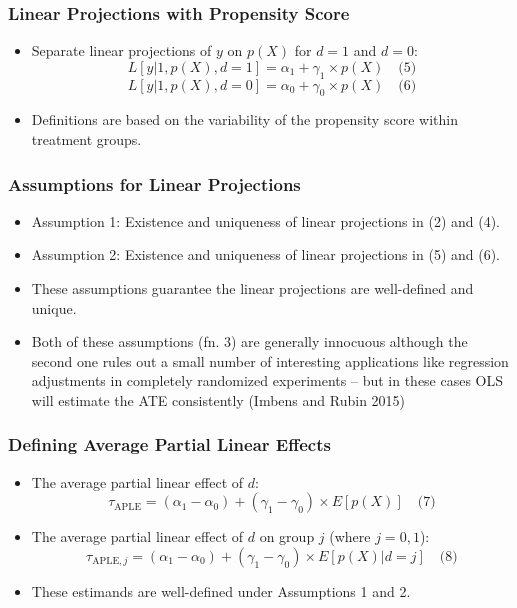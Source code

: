 \documentclass{beamer}
\begin{document}
\begin{frame}
\frametitle{Linear Projections with Propensity Score}
\begin{itemize}
    \item Separate linear projections of \( y \) on \( p(X) \) for \( d = 1 \) and \( d = 0 \):
    \[ L[y | 1, p(X), d = 1] = \alpha_1 + \gamma_1 \times p(X) \quad \text{(5)} \]
    \[ L[y | 1, p(X), d = 0] = \alpha_0 + \gamma_0 \times p(X) \quad \text{(6)} \]
    \item Definitions are based on the variability of the propensity score within treatment groups.
\end{itemize}
\end{frame}

\begin{frame}
\frametitle{Assumptions for Linear Projections}
\begin{itemize}
    \item Assumption 1: Existence and uniqueness of linear projections in (2) and (4).
    \item Assumption 2: Existence and uniqueness of linear projections in (5) and (6).
    \item These assumptions guarantee the linear projections are well-defined and unique.
    \item Both of these assumptions (fn. 3) are generally innocuous although the second one rules out a small number of interesting applications like regression adjustments in completely randomized experiments -- but in these cases OLS will estimate the ATE consistently (Imbens and Rubin 2015)
\end{itemize}
\end{frame}

\begin{frame}
\frametitle{Defining Average Partial Linear Effects}
\begin{itemize}
    \item The average partial linear effect of \( d \):
    \[ \tau_{\text{APLE}} = (\alpha_1 - \alpha_0) + (\gamma_1 - \gamma_0) \times E[p(X)] \quad \text{(7)} \]
    \item The average partial linear effect of \( d \) on group \( j \) (where \( j = 0, 1 \)):
    \[ \tau_{\text{APLE}, j} = (\alpha_1 - \alpha_0) + (\gamma_1 - \gamma_0) \times E[p(X) | d = j] \quad \text{(8)} \]
    \item These estimands are well-defined under Assumptions 1 and 2.
\end{itemize}
\end{frame}
\end{document}
